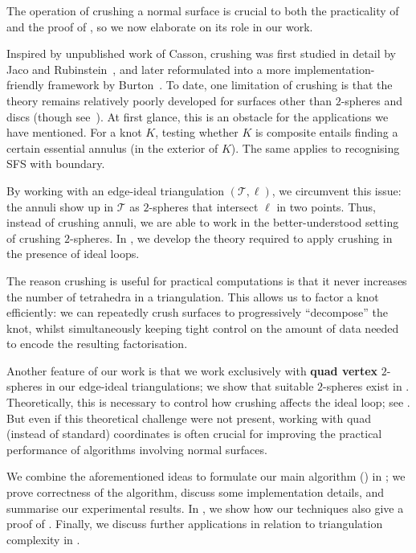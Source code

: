 \documentclass[a4paper,UKenglish,cleveref, autoref, thm-restate]{lipics-v2021}
\newcommand{\tri}{\mathcal{T}}
\begin{document}
The operation of crushing a normal surface is crucial to both the practicality of  and the proof of , so we now elaborate on its role in our work.

Inspired by unpublished work of Casson, crushing was first studied in detail by Jaco and Rubinstein~\cite{jaco2003efficient},
and later reformulated into a more implementation-friendly framework by Burton~\cite{burton2014crushing}.
To date, one limitation of crushing is that the theory remains relatively poorly developed for surfaces other than $2$-spheres and discs (though see~\cite{BHHP2024arXiv,Ichihara2023Crush}).
At first glance, this is an obstacle for the applications we have mentioned.
For a knot $K$, testing whether $K$ is composite entails finding a certain essential
annulus (in the exterior of $K$).
The same applies to recognising SFS with boundary.

By working with an edge-ideal triangulation $(\tri,\ell)$, we circumvent this issue:
the annuli show up in $\tri$ as $2$-spheres that intersect $\ell$ in two points.
Thus, instead of crushing annuli, we are able to work in the better-understood setting of crushing $2$-spheres.
In , we develop the theory required to apply crushing in the presence of ideal loops.

The reason crushing is useful for practical computations is that it never increases the number of tetrahedra in a triangulation. This allows us to factor a knot efficiently: we can repeatedly crush surfaces to progressively ``decompose'' the knot, whilst simultaneously keeping tight control on the amount of data needed to encode the resulting factorisation.

Another feature of our work is that we work exclusively with \textbf{quad vertex} $2$-spheres in our edge-ideal triangulations;
we show that suitable $2$-spheres exist in .
Theoretically, this is necessary to control how crushing affects the ideal loop;
see .
But even if this theoretical challenge were not present, working with quad (instead of standard) coordinates is often crucial for improving the practical performance of algorithms involving normal surfaces.

We combine the aforementioned ideas to formulate our main algorithm () in ;
we prove correctness of the algorithm, discuss some implementation details, and summarise our experimental results.
In , we show how our techniques also give a proof of .
Finally, we discuss further applications in relation to triangulation complexity in .
\end{document}
